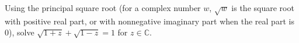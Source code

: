 Using the principal square root (for a complex number $w$, $\sqrt w$ is the square root with positive real part, or with nonnegative imaginary part when the real part is $0$), solve $\sqrt{1+z}+\sqrt{1-z}=1$ for $z\in\mathbb C$.
